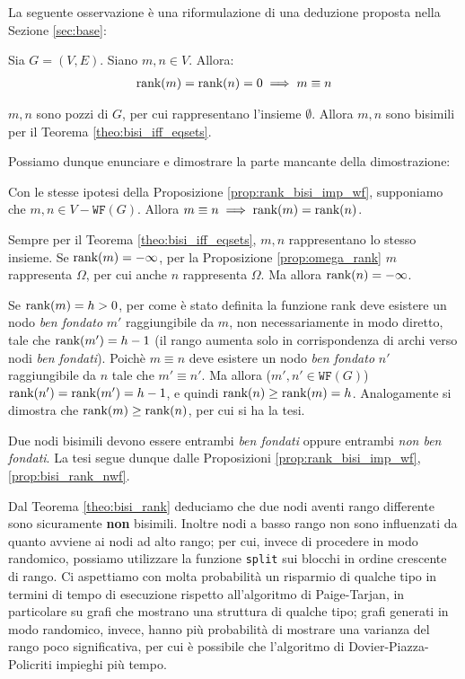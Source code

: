 La seguente osservazione è una riformulazione di una deduzione proposta nella Sezione \ref{sec:base}:
\begin{observation}
    Sia $G = (V,E)$. Siano $m,n \in V$. Allora:
    \begin{gather*}
        \textup{rank}(m) = \textup{rank}(n) = 0 \implies m \equiv n
    \end{gather*}
\end{observation}
\begin{proof2}
    $m,n$ sono pozzi di $G$, per cui rappresentano l'insieme $\emptyset$. Allora $m,n$ sono bisimili per il Teorema \ref{theo:bisi_iff_eqsets}.
\end{proof2}

Possiamo dunque enunciare e dimostrare la parte mancante della dimostrazione:
\begin{proposition}
    \label{prop:bisi_rank_nwf}
    Con le stesse ipotesi della Proposizione \ref{prop:rank_bisi_imp_wf}, supponiamo che $m,n \in V - \texttt{WF}(G)$. Allora $m \equiv n \implies \textup{rank}(m) = \textup{rank}(n)$.
\end{proposition}
\begin{proof2}
    Sempre per il Teorema \ref{theo:bisi_iff_eqsets}, $m,n$ rappresentano lo stesso insieme. Se $\textup{rank}(m) = -\infty$, per la Proposizione \ref{prop:omega_rank} $m$ rappresenta $\Omega$, per cui anche $n$ rappresenta $\Omega$. Ma allora $\textup{rank}(n) = -\infty$.

    Se $\textup{rank}(m) = h > 0$, per come è stato definita la funzione rank deve esistere un nodo \emph{ben fondato} $m'$ raggiungibile da $m$, non necessariamente in modo diretto, tale che $\textup{rank}(m') = h-1$ (il rango aumenta solo in corrispondenza di archi verso nodi \emph{ben fondati}). Poichè $m \equiv n$ deve esistere un nodo \emph{ben fondato} $n'$ raggiungibile da $n$ tale che $m' \equiv n'$. Ma allora ($m',n' \in \texttt{WF}(G)$) $\textup{rank}(n') = \textup{rank}(m') = h-1$, e quindi $\textup{rank}(n) \geq \textup{rank}(m) = h$. Analogamente si dimostra che $\textup{rank}(m) \geq \textup{rank}(n)$, per cui si ha la tesi.
\end{proof2}

\begin{proof2}
    Due nodi bisimili devono essere entrambi \emph{ben fondati} oppure entrambi \emph{non ben fondati}. La tesi segue dunque dalle Proposizioni \ref{prop:rank_bisi_imp_wf}, \ref{prop:bisi_rank_nwf}.
\end{proof2}

Dal Teorema \ref{theo:bisi_rank} deduciamo che due nodi aventi rango differente sono sicuramente \textbf{non} bisimili. Inoltre nodi a basso rango non sono influenzati da quanto avviene ai nodi ad alto rango; per cui, invece di procedere in modo randomico, possiamo utilizzare la funzione \texttt{split} sui blocchi in ordine crescente di rango. Ci aspettiamo con molta probabilità un risparmio di qualche tipo in termini di tempo di esecuzione rispetto all'algoritmo di Paige-Tarjan, in particolare su grafi che mostrano una struttura di qualche tipo; grafi generati in modo randomico, invece, hanno più probabilità di mostrare una varianza del rango poco significativa, per cui è possibile che l'algoritmo di Dovier-Piazza-Policriti impieghi più tempo.

